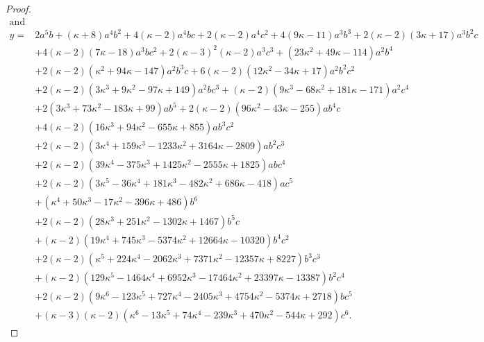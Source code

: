 \documentclass[11pt]{article}
\begin{document}
\begin{proof}
\begin{table}[p]
\begin{align*}
  \text{and}\\
  y = {}&  2 a^5 b
         + (\kappa + 8) a^4 b^2
         + 4 (\kappa - 2) a^4 b c
         + 2 (\kappa - 2) a^4 c^2
         + 4 (9 \kappa - 11) a^3 b^3
         + 2 (\kappa - 2) (3 \kappa + 17) a^3 b^2 c\\
        &+ 4 (\kappa - 2) (7 \kappa - 18) a^3 b c^2
         + 2 (\kappa - 3)^2 (\kappa - 2) a^3 c^3
         + (23 \kappa^2 + 49 \kappa - 114) a^2 b^4\\
        &+ 2 (\kappa - 2) (\kappa^2 + 94 \kappa - 147) a^2 b^3 c
         + 6 (\kappa - 2) (12 \kappa^2 - 34 \kappa + 17) a^2 b^2 c^2\\
        &+ 2 (\kappa - 2) (3 \kappa^3 + 9 \kappa^2 - 97 \kappa + 149) a^2 b c^3
         + (\kappa - 2) (9 \kappa^3 - 68 \kappa^2 + 181 \kappa - 171) a^2 c^4\\
        &+ 2 (3 \kappa^3 + 73 \kappa^2 - 183 \kappa + 99) a b^5
         + 2 (\kappa - 2) (96 \kappa^2 - 43 \kappa - 255) a b^4 c\\
        &+ 4 (\kappa - 2) (16 \kappa^3 + 94 \kappa^2 - 655 \kappa + 855) a b^3 c^2\\
        &+ 2 (\kappa - 2) (3 \kappa^4 + 159 \kappa^3 - 1233 \kappa^2 + 3164 \kappa - 2809) a b^2 c^3\\
        &+ 2 (\kappa - 2) (39 \kappa^4 - 375 \kappa^3 + 1425 \kappa^2 - 2555 \kappa + 1825) a b c^4\\
        &+ 2 (\kappa - 2) (3 \kappa^5 - 36 \kappa^4 + 181 \kappa^3 - 482 \kappa^2 + 686 \kappa - 418) a c^5\\
        &+ (\kappa^4 + 50 \kappa^3 - 17 \kappa^2 - 396 \kappa + 486) b^6\\
        &+ 2 (\kappa - 2) (28 \kappa^3 + 251 \kappa^2 - 1302 \kappa + 1467) b^5 c\\
        &+ (\kappa - 2) (19 \kappa^4 + 745 \kappa^3 - 5374 \kappa^2 + 12664 \kappa - 10320) b^4 c^2\\
        &+ 2 (\kappa - 2) (\kappa^5 + 224 \kappa^4 - 2062 \kappa^3 + 7371 \kappa^2 - 12357 \kappa + 8227) b^3 c^3\\
        &+ (\kappa - 2) (129 \kappa^5 - 1464 \kappa^4 + 6952 \kappa^3 - 17464 \kappa^2 + 23397 \kappa - 13387) b^2 c^4\\
        &+ 2 (\kappa - 2) (9 \kappa^6 - 123 \kappa^5 + 727 \kappa^4 - 2405 \kappa^3 + 4754 \kappa^2 - 5374 \kappa + 2718) b c^5\\
        &+ (\kappa - 3) (\kappa - 2) (\kappa^6 - 13 \kappa^5 + 74 \kappa^4 - 239 \kappa^3 + 470 \kappa^2 - 544 \kappa + 292) c^6.
 \end{align*}
 \caption{The signature of the gadget in Figure~\ref{subfig:gadget:compute:binary:square} is $\langle x,y \rangle$ for the $x$ and $y$ above.}
 \label{tbl:compute:xy}
\end{table}
 

\end{proof}
\end{document}
